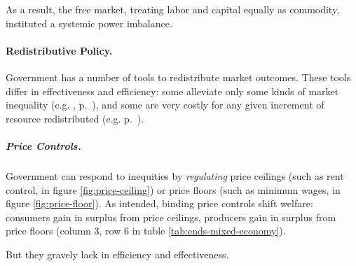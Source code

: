 As a result, the free market, treating labor and capital equally as commodity, instituted a systemic power imbalance.	


\paragraph{Redistributive Policy.}  \label{sec:redistributivepolicy} Government has a number of tools to redistribute market outcomes. These tools differ in effectiveness and efficiency: some alleviate only some kinds of market inequality (e.g. ,  p.~\pageref{sec:affirmativeaction}), and some are very costly for any given increment of resource redistributed (e.g.  p.~\pageref{sec:price-controls}).

\subparagraph{Price Controls.}  \label{sec:price-controls} Government can respond to inequities by \emph{regulating} price ceilings (such as rent control, in figure \ref{fig:price-ceiling}) or price floors (such as minimum wages, in figure \ref{fig:price-floor}). As intended, binding price controls shift welfare: consumers gain in surplus from price ceilings, producers gain in surplus from price floors (column 3, row 6 in table \ref{tab:ends-mixed-economy}).

But they gravely lack in efficiency and effectiveness.

